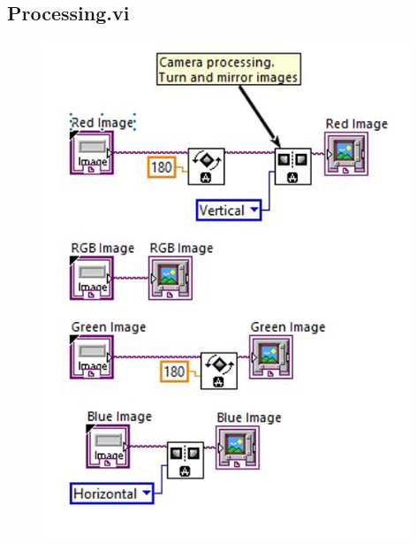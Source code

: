 \subsection{Processing.vi}
\begin{figure}[h]
\begin{center}
\includegraphics[width=11cm]{Pictures/AppCamProc}
\end{center}
\end{figure}

\newpage
